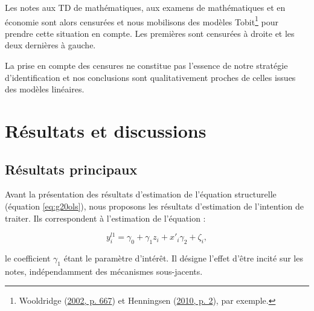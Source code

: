 \documentclass[
]{book}
\begin{document}
Les notes aux TD de mathématiques, aux examens de mathématiques et en économie sont alors censurées et nous mobilisons des modèles Tobit\footnote{Wooldridge (\protect\hyperlink{ref-WOO:02}{2002, p. 667}) et Henningsen (\protect\hyperlink{ref-HEN:10}{2010, p. 2}), par exemple.} pour prendre cette situation en compte. Les premières sont censurées à droite et les deux dernières à gauche.

La prise en compte des censures ne constitue pas l'essence de notre stratégie d'identification et nos conclusions sont qualitativement proches de celles issues des modèles linéaires.

\hypertarget{g20res}{%
\section{Résultats et discussions}\label{g20res}}

\hypertarget{g20resprinc}{%
\subsection{Résultats principaux}\label{g20resprinc}}

Avant la présentation des résultats d'estimation de l'équation structurelle (équation \ref{eq:g20ols}), nous proposons les résultats d'estimation de l'intention de traiter. Ils correspondent à l'estimation de l'équation :

\begin{equation}
\label{eq:g20rf}
y_i^{l1} = \gamma_0 + \gamma_1 z_i + x'_i \gamma_2 + \zeta_i, 
\end{equation}

le coefficient \(\gamma_1\) étant le paramètre d'intérêt. Il désigne l'effet d'être incité sur les notes, indépendamment des mécanismes sous-jacents.
\end{document}
